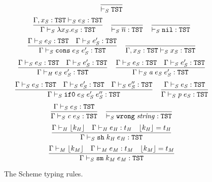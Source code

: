 \begin{figure}[p]
\setlength{\belowcaptionskip}{0pt}
\caption{The Scheme typing rules.}
\[
\frac
{}
{ \vdash_{\mathit{S}} \mathtt{TST}}
\]
\bigskip
\[
\frac
{\Gamma , x_{\mathit{S}} : \mathtt{TST} \vdash_{\mathit{S}} e_{\mathit{S}} : \mathtt{TST}}
{\Gamma \vdash_{\mathit{S}} \lambda x_{\mathit{S}} . e_{\mathit{S}} : \mathtt{TST}}
\quad
\frac
{}
{ \vdash_{\mathit{S}} \overline{n} : \mathtt{TST}}
\quad
\frac
{}
{ \vdash_{\mathit{S}} \mathtt{nil} : \mathtt{TST}}
\]
\[
\frac
{\Gamma \vdash_{\mathit{S}} e_{\mathit{S}} : \mathtt{TST} \quad \Gamma \vdash_{\mathit{S}} e_{\mathit{S}}' : \mathtt{TST}}
{\Gamma \vdash_{\mathit{S}} \mathtt{cons} \; e_{\mathit{S}} \; e_{\mathit{S}}' : \mathtt{TST}}
\quad
\frac
{}
{\Gamma , x_{\mathit{S}} : \mathtt{TST} \vdash_{\mathit{S}} x_{\mathit{S}} : \mathtt{TST}}
\]
\[
\frac
{\Gamma \vdash_{\mathit{S}} e_{\mathit{S}} : \mathtt{TST} \quad \Gamma \vdash_{\mathit{S}} e_{\mathit{S}}' : \mathtt{TST}}
{\Gamma\vdash_{\mathit{H}}e_{\mathit{S}} \; e_{\mathit{S}}':\mathtt{TST}}
\quad
\frac
{\Gamma \vdash_{\mathit{S}} e_{\mathit{S}} : \mathtt{TST} \quad \Gamma \vdash_{\mathit{S}} e_{\mathit{S}}' : \mathtt{TST}}
{\Gamma \vdash_{\mathit{S}} \mathit{a} \; e_{\mathit{S}} \; e_{\mathit{S}}' : \mathtt{TST}}
\]
\[
\frac
{\Gamma \vdash_{\mathit{S}} e_{\mathit{S}} : \mathtt{TST} \quad \Gamma \vdash_{\mathit{S}} e_{\mathit{S}}' : \mathtt{TST} \quad \Gamma \vdash_{\mathit{S}} e_{\mathit{S}}'' : \mathtt{TST}}
{\Gamma \vdash_{\mathit{S}} \mathtt{if0} \; e_{\mathit{S}} \; e_{\mathit{S}}' \; e_{\mathit{S}}'' : \mathtt{TST}}
\quad
\frac
{\Gamma \vdash_{\mathit{S}} e_{\mathit{S}} : \mathtt{TST}}
{\Gamma \vdash_{\mathit{S}} \mathit{p} \; e_{\mathit{S}} : \mathtt{TST}}
\]
\[
\frac
{\Gamma \vdash_{\mathit{S}} e_{\mathit{S}} : \mathtt{TST}}
{\Gamma \vdash_{\mathit{S}} \mathit{c} \; e_{\mathit{S}} : \mathtt{TST}}
\quad
\frac
{}
{ \vdash_{\mathit{S}} \mathtt{wrong} \; \mathit{string} : \mathtt{TST}}
\]
\[
\frac
{\Gamma \vdash_{\mathit{H}} \lfloor k_{\mathit{H}} \rfloor \quad \Gamma \vdash_{\mathit{H}} e_{\mathit{H}} : t_{\mathit{H}} \quad \lfloor k_{\mathit{H}} \rfloor = t_{\mathit{H}}}
{\Gamma \vdash_{\mathit{S}} \mathtt{sh} \; k_{\mathit{H}} \; e_{\mathit{H}} : \mathtt{TST}}
\]
\[
\frac
{\Gamma \vdash_{\mathit{M}} \lfloor k_{\mathit{M}} \rfloor \quad \Gamma \vdash_{\mathit{M}} e_{\mathit{M}} : t_{\mathit{M}} \quad \lfloor k_{\mathit{M}} \rfloor = t_{\mathit{M}}}
{\Gamma \vdash_{\mathit{S}} \mathtt{sm} \; k_{\mathit{M}} \; e_{\mathit{M}} : \mathtt{TST}}
\]
\label{figstr}
\end{figure}